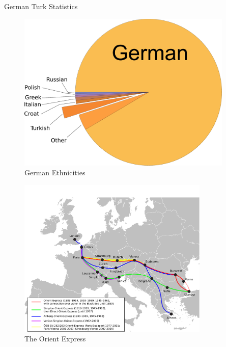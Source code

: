 \documentclass[a4paper, 14pt]{article}
\begin{document}
\centering
{\Huge German Turk Statistics}
\begin{figure}[ht]
	\centering
	\includegraphics[height=3in]{germanpop.pdf}
	\caption{German Ethnicities}
	\label{fig:eth}
\end{figure}

\begin{figure}
	\centering
	\includegraphics[height=3in]{oxpress.png}
	\caption{The Orient Express}
\end{figure}
\end{document}
